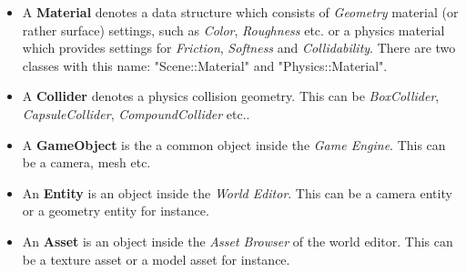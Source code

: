 \documentclass{article}
\begin{document}
\begin{itemize}
\item
A \textbf{Material} denotes a data structure which consists of \textit{Geometry} material (or rather surface) settings,
such as \textit{Color}, \textit{Roughness} etc. or a physics material which provides settings for \textit{Friction}, \textit{Softness} and \textit{Collidability}.
There are two classes with this name: "Scene::Material" and "Physics::Material".

\item
A \textbf{Collider} denotes a physics collision geometry. This can be \textit{BoxCollider}, \textit{CapsuleCollider}, \textit{CompoundCollider} etc..

\item
A \textbf{GameObject} is the a common object inside the \textit{Game Engine}. This can be a camera, mesh etc.

\item
An \textbf{Entity} is an object inside the \textit{World Editor}. This can be a camera entity or a geometry entity for instance.

\item
An \textbf{Asset} is an object inside the \textit{Asset Browser} of the world editor.
This can be a texture asset or a model asset for instance.

\end{itemize}
\end{document}
